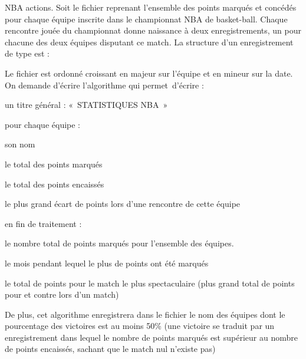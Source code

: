 \begin{Exercice}{NBA actions.}
	Soit le fichier  reprenant l’ensemble des points marqués et
	concédés pour chaque équipe inscrite dans le championnat NBA de
	basket-ball. Chaque rencontre jouée du championnat donne naissance à
	deux enregistrements, un pour chacune des deux équipes disputant ce
	match. La structure d’un enregistrement de type  est
	:
	

	Le fichier est ordonné croissant en majeur sur l'équipe
	et en mineur sur la date. On demande d’écrire l’algorithme qui
	permet~d’écrire :

	\begin{liste}
		\item 
			un titre général : «~STATISTIQUES NBA~»
		\item 
			pour chaque équipe :
			\begin{liste}
				\item 
					son nom 
				\item 
					le total des points marqués
				\item 
					le total des points encaissés
				\item 
					le plus grand écart de points lors d’une rencontre de cette équipe
			\end{liste}
		\item 
			en fin de traitement :
			\begin{liste}
				\item 
					le nombre total de points marqués pour l’ensemble des équipes.
				\item 
					le mois pendant lequel le plus de points ont été marqués
				\item 
					le total de points pour le match le plus spectaculaire (plus grand total
					de points pour et contre lors d’un match)
			\end{liste}
	\end{liste}
	
	De plus, cet algorithme enregistrera dans le fichier  le nom des
	équipes dont le pourcentage des victoires est au moins 50\% (une
	victoire se traduit par un enregistrement dans lequel le nombre de
	points marqués est supérieur au nombre de points encaissés, sachant que
	le match nul n’existe pas)
\end{Exercice}

